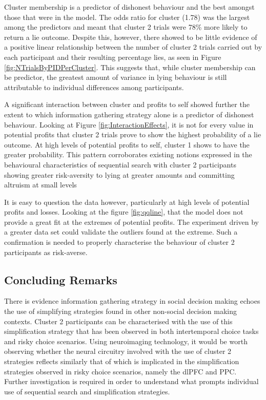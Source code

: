 \documentclass[man, floatsintext]{apa7}
\begin{document}
Cluster membership is a predictor of dishonest behaviour and the best amongst those that were in the model. The odds ratio for cluster (1.78) was the largest among the predictors and meant that cluster 2 trials were 78\% more likely to return a lie outcome. Despite this, however, there showed to be little evidence of a positive linear relationship between the number of cluster 2 trials carried out by each participant and their resulting percentage lies, as seen in Figure \ref{fig:NTrialsByPIDPerCluster}. This suggests that, while cluster membership can be predictor, the greatest amount of variance in lying behaviour is still attributable to individual differences among participants.

A significant interaction between cluster and profits to self showed further the extent to which information gathering strategy alone is a predictor of dishonest behaviour. Looking at Figure \ref{fig:InteractionEffects}, it is not for every value in potential profits that cluster 2 trials prove to show the highest probability of a lie outcome. At high levels of potential profits to self, cluster 1 shows to have the greater probability. This pattern corroborates existing notions expressed in the behavioural characteristics of sequential search with cluster 2 participants showing greater risk-aversity to lying at greater amounts and committing altruism at small levels


It is easy to question the data however, particularly at high levels of potential profits and losses. Looking at the figure \ref{fig:qqline}, that the model does not provide a great fit at the extremes of potential profits. The experiment driven by a greater data set could validate the outliers found at the extreme. Such a confirmation is needed to properly characterise the behaviour of cluster 2 participants as risk-averse. 
\subsection{Concluding Remarks}

There is evidence information gathering strategy in social decision making echoes the use of simplifying strategies found in other non-social decision making contexts. Cluster 2 participants can be characterised with the use of this simplification strategy that has been observed in both intertemporal choice tasks and risky choice scenarios. Using neuroimaging technology, it would be worth observing whether the neural circuitry involved with the use of cluster 2 strategies reflects similarly that of which is implicated in the simplification strategies observed in risky choice scenarios, namely the dlPFC and PPC. Further investigation is required in order to understand what prompts individual use of sequential search and simplification strategies.
\end{document}
